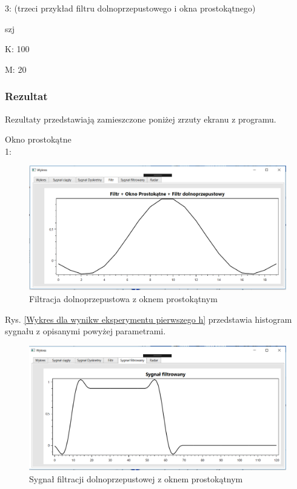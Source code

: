 \documentclass[12pt]{article}
\begin{document}
3: (trzeci przykład filtru dolnoprzepustowego i okna prostokątnego)

\begin{labeling}{szj}
\item [K:] 100
\item [M:] 20 
\end{labeling}
\subsubsection{Rezultat}

Rezultaty przedstawiają zamieszczone poniżej zrzuty ekranu z programu. 

Okno prostokątne
\\1:
\begin{figure}[h!]
 \centering
 \includegraphics[width=12.3cm]{prostFDOP.PNG}
 \vspace{-0.3cm}
 \caption{Filtracja dolnoprzepustowa z oknem prostokątnym}
 \label{Wykres dla wyników eksperymentu drugiego}
\end{figure}
\newpage
Rys. \ref{Wykres dla wynikw eksperymentu pierwszego h} przedstawia histogram sygnału z opisanymi powyżej parametrami. 
\begin{figure}[h!]
 \centering
 \includegraphics[width=12.3cm]{prostSFDP.PNG}
 \vspace{-0.3cm}
 \caption{Sygnał filtracji dolnoprzepustowej z oknem prostokątnym}
 \label{Histogram dla wyników eksperymentu drugiego}
\end{figure}
\end{document}
